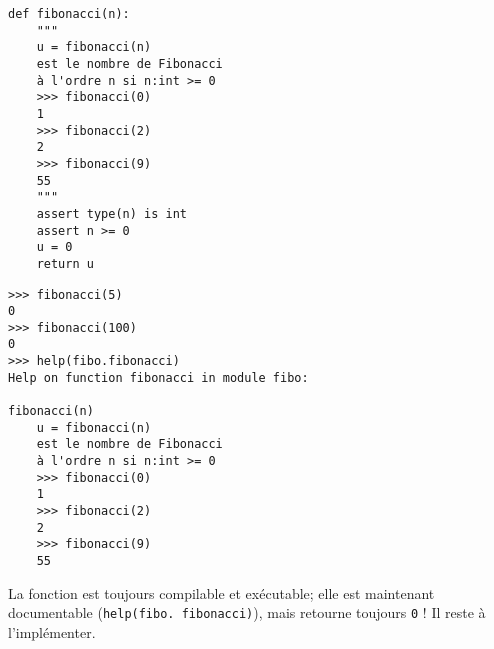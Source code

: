 \noindent\mbox{}\hspace*{1cm}\begin{py}{6cm}
\begin{verbatim}
def fibonacci(n):
    """ 
    u = fibonacci(n) 
    est le nombre de Fibonacci 
    à l'ordre n si n:int >= 0 
    >>> fibonacci(0)
    1
    >>> fibonacci(2)
    2
    >>> fibonacci(9)
    55
    """
    assert type(n) is int
    assert n >= 0
    u = 0
    return u
\end{verbatim}
\end{py}\hfill
\begin{py}{6cm}
\begin{verbatim}
>>> fibonacci(5)
0
>>> fibonacci(100)
0
>>> help(fibo.fibonacci)
Help on function fibonacci in module fibo:

fibonacci(n)
    u = fibonacci(n) 
    est le nombre de Fibonacci 
    à l'ordre n si n:int >= 0 
    >>> fibonacci(0)
    1
    >>> fibonacci(2)
    2
    >>> fibonacci(9)
    55
\end{verbatim}
\end{py}
\hspace*{1cm}\mbox{}\vspace*{2mm}

\noindent La fonction est toujours compilable et exécutable; elle est maintenant
documentable ({\tt help(fibo. fibonacci)}), mais retourne toujours {\tt 0} ! 
Il reste à l'implémenter.

